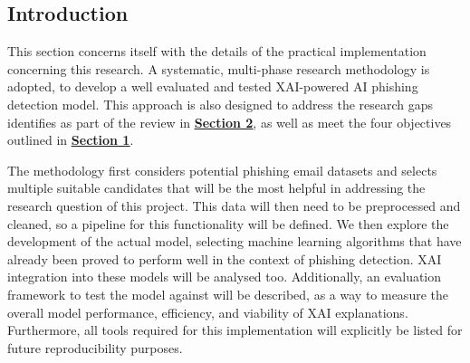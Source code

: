 
\subsection*{Introduction}
This section concerns itself with the details of the practical implementation concerning this research. A systematic, multi-phase research methodology is adopted, to develop a well evaluated and tested XAI-powered AI phishing detection model. This approach is also designed to address the research gaps identifies as part of the review in \hyperref[sec:2-literature-review]{\uline{\textbf{Section 2}}}, as well as meet the four objectives outlined in \hyperref[sec:1-introduction]{\uline{\textbf{Section 1}}}.\newline

\noindent The methodology first considers potential phishing email datasets and selects multiple suitable candidates that will be the most helpful in addressing the research question of this project. This data will then need to be preprocessed and cleaned, so a pipeline for this functionality will be defined. We then explore the development of the actual model, selecting machine learning algorithms that have already been proved to perform well in the context of phishing detection. XAI integration into these models will be analysed too. Additionally, an evaluation framework to test the model against will be described, as a way to measure the overall model performance, efficiency, and viability of XAI explanations. Furthermore, all tools required for this implementation will explicitly be listed for future reproducibility purposes.
